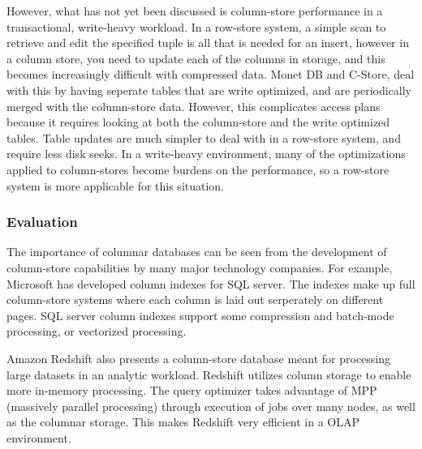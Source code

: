 However, what has not yet been discussed is column-store performance in a transactional, write-heavy workload. In a row-store system, a simple scan to retrieve and edit the specified tuple is all that is needed for an insert, however in a column store, you need to update each of the columns in storage, and this becomes increasingly difficult with compressed data. Monet DB and C-Store, deal with this by having seperate tables that are write optimized, and are periodically merged with the column-store data\cite{cstore}\cite{monet}. However, this complicates access plans because it requires looking at both the column-store and the write optimized tables. Table updates are much simpler to deal with in a row-store system, and require less disk seeks. In a write-heavy environment, many of the optimizations applied to column-stores become burdens on the performance, so a row-store system is more applicable for this situation.




\subsubsection*{Evaluation}



The importance of columnar databases can be seen from the development of column-store capabilities by many major technology companies. For example, Microsoft has developed column indexes for SQL server. The indexes make up full column-store systems where each column is laid out serperately on different pages. SQL server column indexes support some compression and batch-mode processing, or vectorized processing\cite{sql}. 

Amazon Redshift also presents a column-store database meant for processing large datasets in an analytic workload. Redshift utilizes column storage to enable more in-memory processing. The query optimizer takes advantage of MPP (massively parallel processing) through execution of jobs over many nodes, as well as the columnar storage\cite{redshift}. This makes Redshift very efficient in a OLAP environment.


